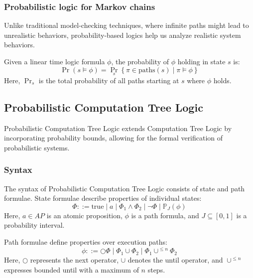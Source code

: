 \subsubsection{Probabilistic logic for Markov chains}
Unlike traditional model-checking techniques, where infinite paths might lead to unrealistic behaviors, probability-based logics help us analyze realistic system behaviors.

Given a linear time logic formula $\phi$, the probability of $\phi$ holding in state $s$ is:
\[\Pr(s\models\phi)=\Pr_s\left\{\pi\in\text{paths}(s)\mid\pi\models\phi\right\}\]
Here, $\Pr_s$ is the total probability of all paths starting at $s$ where $\phi$ holds.

\subsection{Probabilistic Computation Tree Logic}
Probabilistic Computation Tree Logic extends Computation Tree Logic by incorporating probability bounds, allowing for the formal verification of probabilistic systems.

\subsubsection{Syntax}
The syntax of Probabilistic Computation Tree Logic consists of state and path formulae. 
State formulae describe properties of individual states:
\[\Phi::=\text{true}\mid a\mid \Phi_1\land\Phi_2\mid\lnot\Phi\mid\mathbb{P}_J(\phi)\]
\noindent Here, $a \in AP$ is an atomic proposition, $\phi$ is a path formula, and $J \subseteq [0, 1]$ is a probability interval.

Path formulae define properties over execution paths:
\[\phi::=\bigcirc\Phi\mid\Phi_1\cup\Phi_2\mid\Phi_1\cup^{\leq n}\Phi_2\]
\noindent Here, $\bigcirc$ represents the next operator, $\cup$ denotes the until operator, and $\cup^{\leq n}$ expresses bounded until with a maximum of $n$ steps.

